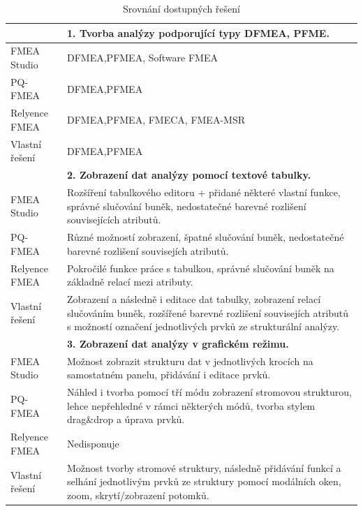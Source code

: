 \begin{longtable}{|p{4cm} | p{12cm} |} 
        \caption{Srovnání dostupných řešení}
\label{tab:compare}
         \hline
& \textbf{1. Tvorba analýzy podporující typy DFMEA, PFME.} \\ \hline
 FMEA Studio &	DFMEA,PFMEA, Software FMEA  \\ 
 PQ-FMEA &	 DFMEA,PFMEA  \\ 
 Relyence FMEA &	 DFMEA,PFMEA, FMECA, FMEA-MSR  \\ 
Vlastní řešení &	 DFMEA,PFMEA \\ \hline

& \textbf{2. Zobrazení dat analýzy pomocí textové tabulky.}  \\ \hline
 FMEA Studio &	Rozšíření tabulkového editoru + přidané některé vlastní funkce, správné slučování buněk, nedostatečné barevné rozlišení souvisejících atributů.  \\ 
 PQ-FMEA &	 Různé možností zobrazení, špatné slučování buněk, nedostatečné barevné rozlišení souvisejích atributů.  \\ 
 Relyence FMEA &	 Pokročilé funkce práce s tabulkou, správné slučování buněk na základně relací mezi atributy.  \\ 
Vlastní řešení &	 Zobrazení a následně i editace dat tabulky, zobrazení relací slučováním buněk, rozšířené barevné rozlišení souvisejích atributů s možností označení jednotlivých prvků ze strukturální analýzy. \\ \hline

& \textbf{3. Zobrazení dat analýzy v grafickém režimu.} \\ \hline
 FMEA Studio &	 Možnost zobrazit strukturu dat v jednotlivých krocích na samostatném panelu, přidávání i editace prvků.\\ 
 PQ-FMEA & Náhled i tvorba pomocí tří módu zobrazení stromovou strukturou, lehce nepřehledné v rámci některých módů, tvorba stylem drag\&drop a úprava prvků.  \\ 
 Relyence FMEA &	 Nedisponuje  \\ 
Vlastní řešení &	 Možnost tvorby stromové struktury, následně přidávání funkcí a selhání jednotlivým prvků ze struktury pomocí modálních oken, zoom, skrytí/zobrazení potomků. \\ \hline


\end{longtable}
